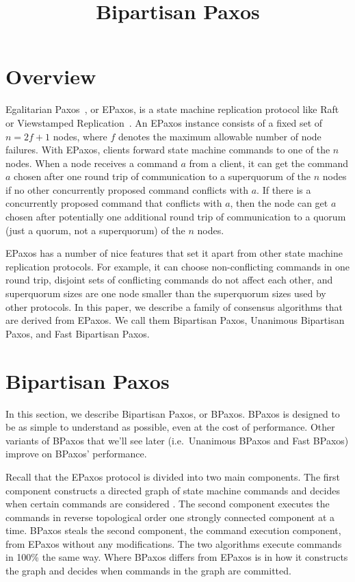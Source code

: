 \documentclass{mwhittaker}
\title{Bipartisan Paxos}
\begin{document}
\maketitle

\section{Overview}
Egalitarian Paxos~\cite{moraru2013there}, or EPaxos, is a state machine
replication protocol like Raft~\cite{ongaro2014search} or Viewstamped
Replication~\cite{liskov2012viewstamped}. An EPaxos instance consists of a
fixed set of $n = 2f + 1$ nodes, where $f$ denotes the maximum allowable number
of node failures. With EPaxos, clients forward state machine commands to one of
the $n$ nodes. When a node receives a command $a$ from a client, it can get the
command $a$ chosen after one round trip of communication to a superquorum of
the $n$ nodes if no other concurrently proposed command conflicts with $a$. If
there is a concurrently proposed command that conflicts with $a$, then the node
can get $a$ chosen after potentially one additional round trip of communication
to a quorum (just a quorum, not a superquorum) of the $n$ nodes.

EPaxos has a number of nice features that set it apart from other state machine
replication protocols. For example, it can choose non-conflicting commands in
one round trip, disjoint sets of conflicting commands do not affect each other,
and superquorum sizes are one node smaller than the superquorum sizes used by
other protocols.
%
In this paper, we describe a family of consensus algorithms that are derived
from EPaxos. We call them Bipartisan Paxos, Unanimous Bipartisan Paxos, and
Fast Bipartisan Paxos.

\section{Bipartisan Paxos}
In this section, we describe Bipartisan Paxos, or BPaxos. BPaxos is designed to
be as simple to understand as possible, even at the cost of performance. Other
variants of BPaxos that we'll see later (i.e.\ Unanimous BPaxos and Fast
BPaxos) improve on BPaxos' performance.

Recall that the EPaxos protocol is divided into two main components. The first
component constructs a directed graph of state machine commands and decides
when certain commands are considered . The second component
executes the commands in reverse topological order one strongly connected
component at a time. BPaxos steals the second component, the command execution
component, from EPaxos without any modifications. The two algorithms execute
commands in 100\% the same way. Where BPaxos differs from EPaxos is in how it
constructs the graph and decides when commands in the graph are committed.
\end{document}
